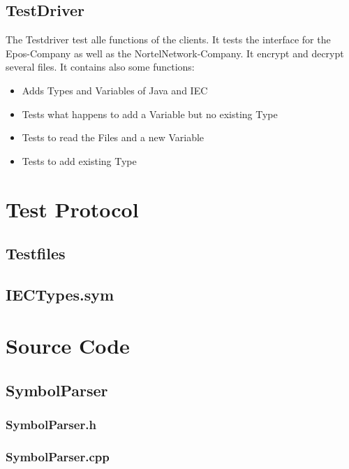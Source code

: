 \subsection{TestDriver}
The Testdriver test alle functions of the clients. It tests the interface for the Epos-Company as well as the NortelNetwork-Company. It encrypt and decrypt several files. It contains also some functions:
\begin{itemize}
	\item Adds Types and Variables of Java and IEC
	\item Tests what happens to add a Variable but no existing Type
	\item Tests to read the Files and a new Variable
	\item Tests to add existing Type 
\end{itemize}

\newpage
\section{Test Protocol}

\subsection{Testfiles}
\subsection{IECTypes.sym}


\newpage
\section{Source Code}

\subsection{SymbolParser}
\subsubsection{SymbolParser.h}
\subsubsection{SymbolParser.cpp}
\newpage

